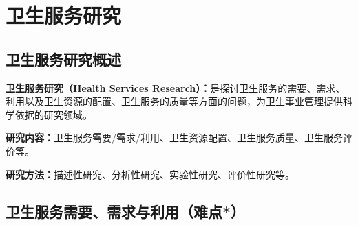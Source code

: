 \chapter{卫生服务研究}
\setcounter{chapter}{9}

\section{卫生服务研究概述}

\begin{defbox}
\textbf{卫生服务研究（Health Services Research）：}是探讨卫生服务的需要、需求、利用以及卫生资源的配置、卫生服务的质量等方面的问题，为卫生事业管理提供科学依据的研究领域。

\textbf{研究内容：}卫生服务需要/需求/利用、卫生资源配置、卫生服务质量、卫生服务评价等。

\textbf{研究方法：}描述性研究、分析性研究、实验性研究、评价性研究等。
\end{defbox}

\section{卫生服务需要、需求与利用（难点*）}

